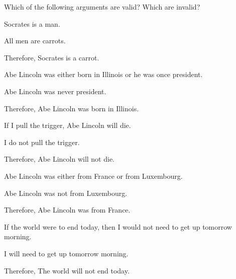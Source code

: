 
\practiceproblems
\problempart
Which of the following arguments are valid? Which are invalid?

\begin{earg}
\item Socrates is a man.
\item All men are carrots.
\item Therefore, Socrates is a carrot.
\end{earg}

\begin{earg}
\item Abe Lincoln was either born in Illinois or he was once president.
\item Abe Lincoln was never president.
\item Therefore, Abe Lincoln was born in Illinois.
\end{earg}

\noindent\begin{minipage}{0.99\textwidth}
\begin{earg}
\item If I pull the trigger, Abe Lincoln will die.
\item I do not pull the trigger.
\item Therefore, Abe Lincoln will not die.
\end{earg}
\vspace{2mm}
\end{minipage}

\noindent\begin{minipage}{1.0\textwidth}
\begin{earg}
\item Abe Lincoln was either from France or from Luxembourg.
\item Abe Lincoln was not from Luxembourg.
\item Therefore, Abe Lincoln was from France.
\end{earg}
\vspace{-3mm}
\end{minipage}

\begin{earg}
\item If the world were to end today, then I would not need to get up tomorrow morning.
\item I will need to get up tomorrow morning.
\item Therefore, The world will not end today.
\end{earg}

